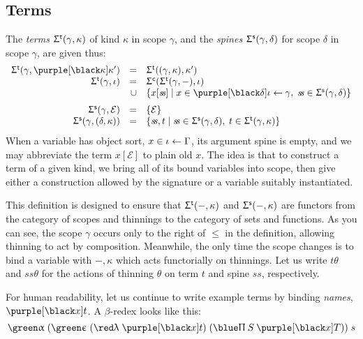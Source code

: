 \documentclass[natbib]{article}
\newcommand{\EC}{\mathcal{E}}
\begin{document}
\subsection{Terms}
\newcommand{\Sgt}[2]{\Sg^{\mathsf{t}}(#1,#2)} 
\newcommand{\Sgs}[2]{\Sg^{\mathsf{s}}(#1,#2)}
\newcommand{\sss}{\mathit{s\!s}} 
The \emph{terms} $\Sgt\gamma\kappa$ of kind $\kappa$ in scope $\gamma$, and the \emph{spines}
$\Sgs\gamma\delta$ for scope $\delta$ in scope $\gamma$, are given thus:
\[\begin{array}{rrl}
\Sgt\gamma{\bnd\kappa\kappa'} & = & \Sgt{(\gamma,\kappa)}{\kappa'} \\
\Sgt\gamma{\iota} & = & \Sgc{\Sgt\gamma-}\iota \\
                  & \cup & \{x[\sss] \;|\; x\in\bnd\delta\iota\fae\gamma,\; \sss\in\Sgs\gamma\delta\} \medskip \\
\Sgs\gamma\EC & = & \{\EC\} \\
\Sgs\gamma{(\delta,\kappa)} & = & \{\sss,t \;|\; \sss\in \Sgs\gamma\delta,\; t\in \Sgt\gamma\kappa\}
\end{array}\]
When a variable has object sort, $x\in\iota\leftarrow\Gamma$, its argument spine is empty, and we may abbreviate the term $x[\EC]$ to plain old $x$. The idea is that to construct a term of a given kind, we bring all of its bound variables into scope, then give either a construction allowed by the signature or a variable suitably instantiated.

This definition is designed to ensure that $\Sgt-\kappa$ and $\Sgs-\kappa$ are functors from the category of scopes and thinnings to the category of sets and functions. As you can see, the scope $\gamma$ occurs only to the right of $\le$ in the definition, allowing thinning to act by composition. Meanwhile, the only time the scope changes is to bind a variable with $-,\kappa$ which acts functorially on thinnings. Let us write $t\theta$ and $\sss\theta$ for the actions of thinning $\theta$ on term $t$ and spine $\sss$, respectively.

For human readability, let us continue to write example terms by binding \emph{names}, $\bnd xt$. A $\beta$-redex looks like this:
\[
\apc\;(\tyc\;(\lac\;\bnd xt)\;(\pic\:S\:\bnd xT))\;s
\]




\end{document}
